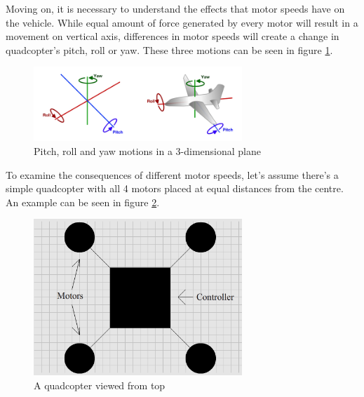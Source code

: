 Moving on, it is necessary to understand the effects that motor speeds have on the vehicle. While equal amount of force generated by every motor will result in a movement on vertical axis, differences in motor speeds will create a change in quadcopter's pitch, roll or yaw. These three motions can be seen in figure \ref{droneMotions}.
\begin{figure}[H]
  \centering
    \includegraphics[width=0.7\textwidth]{images/droneMotions.png}
	\caption{Pitch, roll and yaw motions in a 3-dimensional plane\cite{dMotions}}
	\label{droneMotions}
\end{figure}

To examine the consequences of different motor speeds, let's assume there's a simple quadcopter with all 4 motors placed at equal distances from the centre. An example can be seen in figure \ref{droneIdle}.
\begin{figure}[H]
  \centering
    \includegraphics[width=0.7\textwidth]{images/droneIdle.png}
	\caption{A quadcopter viewed from top}
	\label{droneIdle}
\end{figure}

